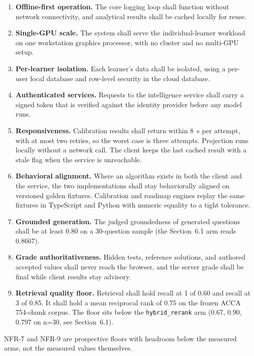 \begin{enumerate}[label=\textbf{NFR-\arabic*},noitemsep,leftmargin=*]
    \item \textbf{Offline-first operation.} The core logging loop shall function without network connectivity, and analytical results shall be cached locally for reuse.
    \item \textbf{Single-GPU scale.} The system shall serve the individual-learner workload on one workstation graphics processor, with no cluster and no multi-GPU setup.
    \item \textbf{Per-learner isolation.} Each learner's data shall be isolated, using a per-user local database and row-level security in the cloud database.
    \item \textbf{Authenticated services.} Requests to the intelligence service shall carry a signed token that is verified against the identity provider before any model runs.
    \item \textbf{Responsiveness.} Calibration results shall return within 8~s per attempt, with at most two retries, so the worst case is three attempts. Projection runs locally without a network call. The client keeps the last cached result with a stale flag when the service is unreachable.
    \item \textbf{Behavioral alignment.} Where an algorithm exists in both the client and the service, the two implementations shall stay behaviorally aligned on versioned golden fixtures. Calibration and roadmap engines replay the same fixtures in TypeScript and Python with numeric equality to a tight tolerance.
    \item \textbf{Grounded generation.} The judged groundedness of generated questions shall be at least 0.80 on a 30-question sample (the Section~6.1 arm reads 0.8667).
    \item \textbf{Grade authoritativeness.} Hidden tests, reference solutions, and authored accepted values shall never reach the browser, and the server grade shall be final while client results stay advisory.
    \item \textbf{Retrieval quality floor.} Retrieval shall hold recall at 1 of 0.60 and recall at 3 of 0.85. It shall hold a mean reciprocal rank of 0.75 on the frozen ACCA 754-chunk corpus. The floor sits below the \texttt{hybrid\_rerank} arm (0.67, 0.90, 0.797 on n=30, see Section~6.1).
\end{enumerate}
NFR-7 and NFR-9 are prospective floors with headroom below the measured arms, not the measured values themselves.

